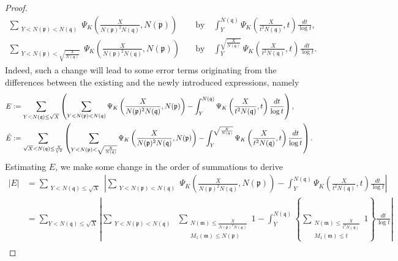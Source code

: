 \documentclass[12pt]{article}
\numberwithin{equation}{section}
\numberwithin{equation}{section}
\begin{document}
\begin{proof}
\begin{align}
     \sum_{\substack{Y<N(\mathfrak{p})<N(\mathfrak{q}) }} \Psi_K\left(\frac{X}{N(\mathfrak{p})^2N(\mathfrak{q})},N(\mathfrak{p})\right) \quad &\text{by} \quad \int_Y^{N(\mathfrak{q})} \Psi_K\left(\frac{X}{t^2N(\mathfrak{q})},t\right)\frac{dt}{\log t} ,\nonumber \\
     \sum_{\substack{Y<N(\mathfrak{p})<\sqrt{\frac{X}{N(\mathfrak{q})} } }} \Psi_K\left(\frac{X}{N(\mathfrak{p})^2N(\mathfrak{q})},N(\mathfrak{p})\right) \quad &\text{by} \quad \int_Y^{\sqrt{\frac{X}{N(\mathfrak{q})} } } \Psi_K\left(\frac{X}{t^2N(\mathfrak{q})},t\right)\frac{dt}{\log t}. \nonumber
\end{align}
Indeed, such a change will lead to some error terms originating from the differences between the existing and the newly introduced expressions, namely
\begin{align}
    E&: = \sum_{\substack{Y <N(\mathfrak{q}) \leq \sqrt{X}}}\left(   \sum_{\substack{Y<N(\mathfrak{p})<N(\mathfrak{q}) }} \Psi_K \left(\frac{X}{N(\mathfrak{p})^2N(\mathfrak{q})},N(\mathfrak{p})\right) - \int_Y^{N(\mathfrak{q})} \Psi_K\left(\frac{X}{t^2N(\mathfrak{q})},t\right)\frac{dt}{\log t}          \right), \nonumber \\
    \Tilde{E} &:= \sum_{\sqrt{X} < N(\mathfrak{q}) \leq \frac{X}{Y^2}} \left(        \sum_{\substack{Y<N(\mathfrak{p})<\sqrt{\frac{X}{N(\mathfrak{q})} } }} \Psi_K\left(\frac{X}{N(\mathfrak{p})^2N(\mathfrak{q})},N(\mathfrak{p})\right) - \int_Y^{\sqrt{\frac{X}{N(\mathfrak{q})} } } \Psi_K\left(\frac{X}{t^2N(\mathfrak{q})},t\right)\frac{dt}{\log t}           \right) .\nonumber
\end{align}
Estimating $E$, we make some change in the order of summations to derive
\begin{align}
    |E| &= \sum_{\substack{Y <N(\mathfrak{q}) \leq \sqrt{X}}}\left|   \sum_{\substack{Y<N(\mathfrak{p})<N(\mathfrak{q}) }} \Psi_K\left(\frac{X}{N(\mathfrak{p})^2N(\mathfrak{q})},N(\mathfrak{p})\right) - \int_Y^{N(\mathfrak{q})} \Psi_K\left(\frac{X}{t^2N(\mathfrak{q})},t\right)\frac{dt}{\log t}          \right| \nonumber \\
    &=  \sum_{Y<N(\mathfrak{q})\leq \sqrt{X}}\left|\sum_{\substack{Y<N(\mathfrak{p})<N(\mathfrak{q}) }}\; \sum_{\substack{N(\mathfrak{m}) \leq \frac{X}{N(\mathfrak{p})^2N(\mathfrak{q})} \\ M_1(\mathfrak{m})\leq N(\mathfrak{p})}} 1- \int_Y^{N(\mathfrak{q})} \left\{\sum_{\substack{N(\mathfrak{m}) \leq \frac{X}{t^2N(\mathfrak{q})} \\ M_1(\mathfrak{m})\leq t}}1\right\}\frac{dt}{\log t}\right|  \nonumber \\

\end{align}
\end{proof}
\end{document}
